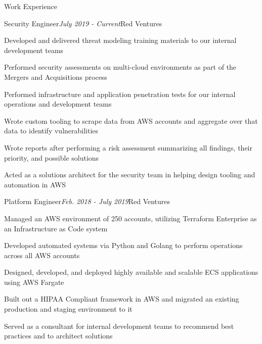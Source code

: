 \documentclass{resume} %
\begin{document}
\begin{rSection}{\vspace{-5pt}Work Experience}

  \begin{rSubsection}{Security Engineer}{\em July 2019 - Current}{Red Ventures}{}
  \item {Developed and delivered threat modeling training materials to our internal development teams}
  \item {Performed security assessments on multi-cloud environments as part of the Mergers and Acquisitions process}
  \item {Performed infrastructure and application penetration tests for our internal operations and development teams}
  \item {Wrote custom tooling to scrape data from AWS accounts and aggregate over that data to identify vulnerabilities}
  \item {Wrote reports after performing a risk assessment summarizing all findings, their priority, and possible solutions}
  \item {Acted as a solutions architect for the security team in helping design tooling and automation in AWS}

  \end{rSubsection}



\begin{rSubsection}{Platform Engineer}{\em Feb. 2018 - July 2019}{Red Ventures}{}
\item {Managed an AWS environment of 250 accounts, utilizing Terraform Enterprise as an Infrastructure as Code system}
\item {Developed automated systems via Python and Golang to perform operations across all AWS accounts}
\item {Designed, developed, and deployed highly available and scalable ECS applications using AWS Fargate}
\item {Built out a HIPAA Compliant framework in AWS and migrated an existing production and staging environment to it}
\item {Served as a consultant for internal development teams to recommend best practices and to architect solutions}

\end{rSubsection}



\end{rSection}
\end{document}
